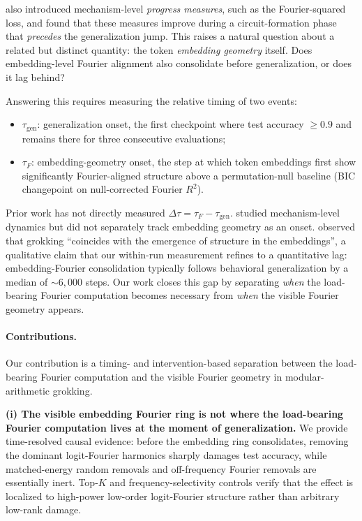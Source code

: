 \documentclass{article}
\newcommand{\taug}{\tau_{\mathrm{gen}}}
\newcommand{\tauf}{\tau_{F}}
\newcommand{\Dtau}{\Delta\tau}
\begin{document}
\citet{nanda2023progress} also introduced mechanism-level
\emph{progress measures}, such as the Fourier-squared
loss, and found that these measures improve during a circuit-formation
phase that \emph{precedes} the generalization jump.
This raises a natural question about a related but distinct quantity:
the token \emph{embedding geometry} itself.
Does embedding-level Fourier alignment also consolidate before
generalization, or does it lag behind?

Answering this requires measuring the relative timing of two events:
\begin{itemize}
  \item $\taug$: generalization onset, the first checkpoint where
    test accuracy $\geq 0.9$ and remains there for three consecutive
    evaluations;
  \item $\tauf$: embedding-geometry onset, the step at which token
    embeddings first show significantly Fourier-aligned structure
    above a permutation-null baseline (BIC changepoint on
    null-corrected Fourier $R^2$).
\end{itemize}

Prior work has not directly measured $\Dtau = \tauf - \taug$.
\citet{nanda2023progress} studied mechanism-level dynamics but did
not separately track embedding geometry as an onset.
\citet{liu2022towards} observed that grokking ``coincides with the
emergence of structure in the embeddings'', a qualitative claim
that our within-run measurement refines to a quantitative lag:
embedding-Fourier consolidation typically follows behavioral
generalization by a median of $\sim$$6{,}000$ steps.
Our work closes this gap by separating \emph{when} the load-bearing
Fourier computation becomes necessary from \emph{when} the visible
Fourier geometry appears.

\paragraph{Contributions.}
Our contribution is a timing- and intervention-based separation
between the load-bearing Fourier computation and the visible
Fourier geometry in modular-arithmetic grokking.

\textbf{(i) The visible embedding Fourier ring is not where the
load-bearing Fourier computation lives at the moment of
generalization.}
We provide time-resolved causal evidence: before the embedding ring
consolidates, removing the dominant logit-Fourier harmonics sharply
damages test accuracy, while matched-energy random removals and
off-frequency Fourier removals are essentially inert.
Top-$K$ and frequency-selectivity controls verify that the effect is
localized to high-power low-order logit-Fourier structure rather
than arbitrary low-rank damage.
\end{document}
